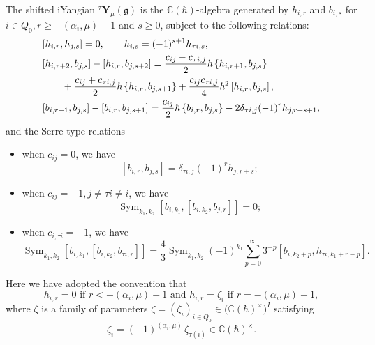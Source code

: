 \begin{definition}
\label{shiftedTY}
The shifted iYangian ${}^{\tau}\mathbf{Y}_{\mu}(\mathfrak{g})$ is the $\mathbb{C}(\hbar)$-algebra generated by 
$h_{i,r}$ and $b_{i,s}$ for $i\in Q_0, r\geq -( \alpha_i,\mu)-1$ and $s\geq 0$, subject to the following relations:
\begin{align}
\label{eq:hcomm}
    & {\left[h_{i, r}, h_{j, s}\right]=0, \qquad 
    h_{i,s} = (-1)^{s+1} h_{\tau i,s}}, 
        \\
\label{eq:hbcomm}
    & {\left[h_{i, r+2}, b_{j, s}\right]-\left[h_{i, r}, b_{j, s+2}\right]} 
    =\frac{c_{i j}-c_{\tau i, j}}{2} \hbar\left\{h_{i, r+1}, b_{j, s}\right\}
    \\\notag  & \qquad 
    +\frac{c_{i j}+c_{\tau i, j}}{2} \hbar\left\{h_{i, r}, b_{j, s+1}\right\}
    +\frac{c_{i j} c_{\tau i, j}}{4} \hbar^2\left[h_{i, r}, b_{j, s}\right], 
        \\
\label{eq:bcomm}
    & {\left[b_{i, r+1}, b_{j, s}\right]-\left[b_{i, r}, b_{j, s+1}\right]=\frac{c_{i j}}{2}\hbar \left\{b_{i, r}, b_{j, s}\right\}-2 \delta_{\tau i, j}(-1)^r h_{j, r+s+1}},
\end{align}
and the Serre-type relations  
\begin{itemize}
    \item when $c_{i j}=0$, we have %
\begin{equation}\label{eq:commSerre}
    \left[b_{i, r}, b_{j, s}\right]=\delta_{\tau i, j}(-1)^r h_{j, r+s};
\end{equation}
\item when $c_{i j}=-1, j \neq \tau i \neq i$, we have %
\begin{equation}\label{eq:usualSerre}
    \operatorname{Sym}_{k_1, k_2}\left[b_{i, k_1},\left[b_{i, k_2}, b_{j, r}\right]\right]=0;
\end{equation}
\item when $c_{i, \tau i}=-1$, we have 
\begin{equation}\label{eq:iSerre}
    \operatorname{Sym}_{k_1, k_2}\left[b_{i, k_1},\left[b_{i, k_2}, b_{\tau i, r}\right]\right]=\frac{4}{3} \operatorname{Sym}_{k_1, k_2}(-1)^{k_1} \sum_{p=0}^{\infty} 3^{-p}\left[b_{i, k_2+p}, h_{\tau i, k_1+r-p}\right].
\end{equation}
\end{itemize}
Here we have adopted the convention that 
\begin{equation}\label{eq:vanishing}
\mbox{$h_{i,r}=0$ if $r<-(\alpha_i, \mu)-1$ and $h_{i,r}=\zeta_i$ if $r=-(\alpha_i, \mu)-1$},
\end{equation}
where $\zeta$ is a family of parameters 
$\zeta = (\zeta_i)_{i \in Q_0} \in \bigl(\mathbb{C}(\hbar)^\times\bigr)^I$ satisfying 
\begin{equation}\label{eq:zeta}
  \zeta_i = (-1)^{(\alpha_i, \mu)}\,\zeta_{\tau(i)} 
   \in \mathbb{C}(\hbar)^\times.
\end{equation}
\end{definition}

